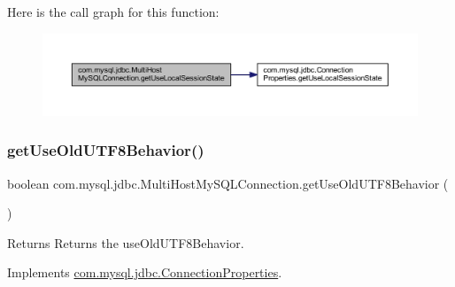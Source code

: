 Here is the call graph for this function\+:
\nopagebreak
\begin{figure}[H]
\begin{center}
\leavevmode
\includegraphics[width=350pt]{classcom_1_1mysql_1_1jdbc_1_1_multi_host_my_s_q_l_connection_a816d458e4e3e4cd753a31b84055deef7_cgraph}
\end{center}
\end{figure}
\mbox{\label{classcom_1_1mysql_1_1jdbc_1_1_multi_host_my_s_q_l_connection_a36f0772c382523e46208fde9a19ae456}} 
\subsubsection{\texorpdfstring{get\+Use\+Old\+U\+T\+F8\+Behavior()}{getUseOldUTF8Behavior()}}
{\footnotesize\ttfamily boolean com.\+mysql.\+jdbc.\+Multi\+Host\+My\+S\+Q\+L\+Connection.\+get\+Use\+Old\+U\+T\+F8\+Behavior (\begin{DoxyParamCaption}{ }\end{DoxyParamCaption})}

\begin{DoxyReturn}{Returns}
Returns the use\+Old\+U\+T\+F8\+Behavior. 
\end{DoxyReturn}


Implements \mbox{\hyperlink{interfacecom_1_1mysql_1_1jdbc_1_1_connection_properties_a4f8cf54b1bafd8f3e11f32f5c3609dd6}{com.\+mysql.\+jdbc.\+Connection\+Properties}}.


